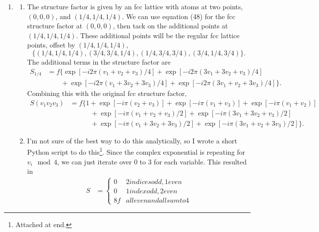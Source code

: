 \documentclass{homework}
\begin{document}
\begin{enumerate}
		\pagebreak
		
		\item %
			\begin{enumerate}
				\item The structure factor is given by an fcc lattice with atoms at two points, $(0, 0, 0)$, and $(1/4, 1/4, 1/4)$. We can use equation (48) for the fcc structure factor at $(0, 0, 0)$, then tack on the additional points at $(1/4, 1/4, 1/4)$. These additional points will be the regular fcc lattice points, offset by $(1/4, 1/4, 1/4)$, 
				$$\{(1/4, 1/4, 1/4), (3/4, 3/4, 1/4),  (1/4, 3/4, 3/4), (3/4, 1/4, 3/4)\}.$$
				The additional terms in the structure factor are
				\begin{align*}
					S_{1/4} & = f \Big\{
						\exp[-i2 \pi (v_1 + v_2 + v_3)/4] + \exp[-i2 \pi(3v_1 + 3v_2 + v_3)/4] \\
						& \qquad + \exp[-i2\pi(v_1 + 3 v_2 + 3 v_3) / 4] + \exp[-i2 \pi (3 v_1 + v_2 + 3v_3) / 4]\Big\}.
				\end{align*}
				Combining this with the original fcc structure factor,
				 \begin{align*}
					S(v_1 v_2 v_3) & = f \Big\{
						1 + \exp[-i \pi (v_2 + v_3)]+ \exp[-i \pi (v_1 + v_3)] + \exp[-i \pi (v_1 + v_2)] \\
						& \hspace{3em} + \exp[-i \pi (v_1 + v_2 + v_3)/2] + \exp[-i \pi(3v_1 + 3v_2 + v_3)/2] \\
						& \hspace{3em} + \exp[-i\pi(v_1 + 3 v_2 + 3 v_3) / 2] + \exp[-i \pi (3 v_1 + v_2 + 3v_3) / 2]\Big\}.
				\end{align*}
				
				
				\item  I'm not sure of the best way to do this analytically, so I wrote a short Python script to do this\footnote{Attached at end.}. Since the complex exponential is repeating for $v_i \mod 4$, we can just iterate over $0$ to $3$ for each variable. This resulted in \begin{align*}
					S & = \begin{cases*}
						0 & 2 indices odd, 1 even \\
						0 & 1 index odd, 2 even \\
						8f & all even and all sum to 4
					\end{cases*}
				\end{align*}
			\end{enumerate}
		
		\pagebreak
		

\end{enumerate}
\end{document}

